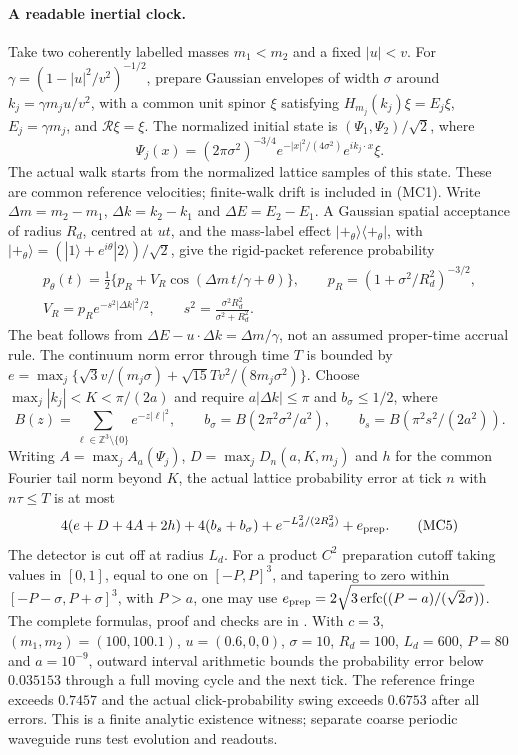 \paragraph{A readable inertial clock.}
Take two coherently labelled masses $m_1<m_2$ and a fixed
$|u|<v$. For $\gamma=(1-|u|^2/v^2)^{-1/2}$, prepare Gaussian envelopes
of width $\sigma$ around $k_j=\gamma m_j u/v^2$, with a common unit spinor
$\xi$ satisfying $H_{m_j}(k_j)\xi=E_j\xi$, $E_j=\gamma m_j$, and
$\mathcal R\xi=\xi$. The normalized initial state is
$(\Psi_1,\Psi_2)/\sqrt2$, where
\[
 \Psi_j(x)=(2\pi\sigma^2)^{-3/4}
       e^{-|x|^2/(4\sigma^2)}e^{ik_j\cdot x}\xi.
\]
The actual walk starts from the normalized lattice samples of this state.
These are common reference velocities; finite-walk drift is included in
(MC1). Write $\Delta m=m_2-m_1$, $\Delta k=k_2-k_1$ and
$\Delta E=E_2-E_1$.
A Gaussian spatial acceptance of radius $R_d$, centred at $ut$, and the
mass-label effect $|+_\theta\rangle\langle+_\theta|$, with
$|+_\theta\rangle=(|1\rangle+e^{i\theta}|2\rangle)/\sqrt2$, give the
rigid-packet reference probability
\[
 \begin{gathered}
 p_\theta(t)=\tfrac12\{p_R+V_R\cos(\Delta m\,t/\gamma+\theta)\},
 \qquad p_R=(1+\sigma^2/R_d^2)^{-3/2},\\
 V_R=p_Re^{-s^2|\Delta k|^2/2},\qquad
 s^2=\frac{\sigma^2R_d^2}{\sigma^2+R_d^2}.
 \end{gathered}
 \tag{MC4}
\]
The beat follows from $\Delta E-u\cdot\Delta k=\Delta m/\gamma$,
not an assumed proper-time accrual rule. The continuum norm error through
time $T$ is bounded by
$e=\max_j\{\sqrt3v/(m_j\sigma)+\sqrt{15}Tv^2/(8m_j\sigma^2)\}$.
Choose $\max_j|k_j|<K<\pi/(2a)$ and require
$a|\Delta k|\le\pi$ and $b_\sigma\le1/2$, where
\[
 B(z)=\sum_{\ell\in\mathbb Z^3\setminus\{0\}}e^{-z|\ell|^2},
 \qquad b_\sigma=B(2\pi^2\sigma^2/a^2),\qquad
 b_s=B(\pi^2s^2/(2a^2)).
\]
Writing $A=\max_jA_a(\Psi_j)$, $D=\max_jD_n(a,K,m_j)$ and $h$ for
the common Fourier tail norm beyond $K$, the actual lattice probability
error at tick $n$ with $n\tau\le T$ is at most
\[
 4(e+D+4A+2h)+4(b_s+b_\sigma)
       +e^{-L_d^2/(2R_d^2)}+e_{\rm prep}.
 \tag{MC5}
\]
The detector is cut off at radius $L_d$. For a product $C^2$ preparation
cutoff taking values in $[0,1]$, equal to one on $[-P,P]^3$, and tapering to zero within
$[-P-\sigma,P+\sigma]^3$, with $P>a$, one may use
$e_{\rm prep}=2\sqrt{3\operatorname{erfc}((P-a)/(\sqrt2\sigma))}$.
The complete formulas, proof and checks are in
.
With $c=3$, $(m_1,m_2)=(100,100.1)$, $u=(0.6,0,0)$,
$\sigma=10$, $R_d=100$, $L_d=600$, $P=80$ and
$a=10^{-9}$, outward interval arithmetic bounds the probability error below
$0.035153$ through a full moving cycle and the next tick. The reference
fringe exceeds $0.7457$ and the actual click-probability swing exceeds
$0.6753$ after all errors. This is a finite analytic existence witness;
separate coarse periodic waveguide runs test evolution and readouts.

